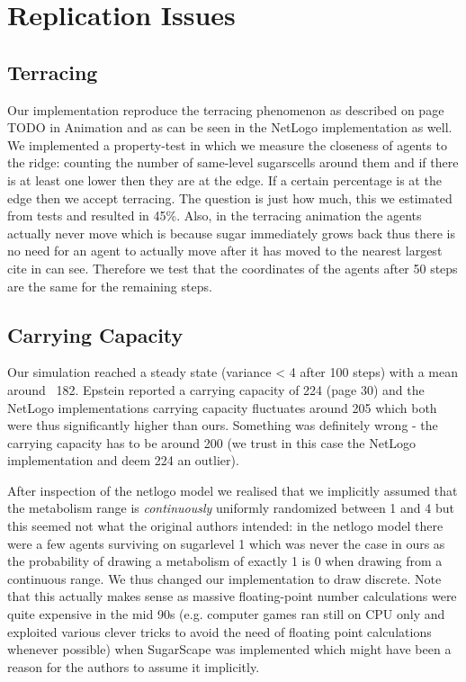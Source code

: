 \section{Replication Issues}
\subsection{Terracing}
Our implementation reproduce the terracing phenomenon as described on page TODO in Animation and as can be seen in the NetLogo implementation as well. We implemented a property-test in which we measure the closeness of agents to the ridge: counting the number of same-level sugarscells around them and if there is at least one lower then they are at the edge. If a certain percentage is at the edge then we accept terracing. The question is just how much, this we estimated from tests and resulted in 45\%. Also, in the terracing animation the agents actually never move which is because sugar immediately grows back thus there is no need for an agent to actually move after it has moved to the nearest largest cite in can see. Therefore we test that the coordinates of the agents after 50 steps are the same for the remaining steps.

\subsection{Carrying Capacity}
Our simulation reached a steady state (variance < 4 after 100 steps) with a mean around ~182. Epstein reported a carrying capacity of 224 (page 30) and the NetLogo implementations carrying capacity fluctuates around 205 which both were thus significantly higher than ours. Something was definitely wrong - the carrying capacity has to be around 200 (we trust in this case the NetLogo implementation and deem 224 an outlier).

After inspection of the netlogo model we realised that we implicitly assumed that the metabolism range is \textit{continuously} uniformly randomized between 1 and 4 but this seemed not what the original authors intended: in the netlogo model there were a few agents surviving on sugarlevel 1 which was never the case in ours as the probability of drawing a metabolism of exactly 1 is 0 when drawing from a continuous range. We thus changed our implementation to draw discrete. Note that this actually makes sense as massive floating-point number calculations were quite expensive in the mid 90s (e.g. computer games ran still on CPU only and exploited various  clever tricks to avoid the need of floating point calculations whenever possible) when SugarScape was implemented which might have been a reason for the authors to assume it implicitly.

